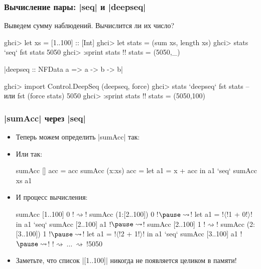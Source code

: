 \documentclass[11pt]{beamer}
\begin{document}
\begin{frame}[fragile]
  \frametitle{Вычисление пары: \haskinline|seq| и \haskinline|deepseq|}
  \small
  Выведем сумму наблюдений. Вычислится ли их число?
  \begin{haskellsmall}
    ghci> let xs = [1..100] :: [Int]
    ghci> let stats = (sum xs, length xs)
    ghci> stats `seq` fst stats
    5050
    ghci> :sprint stats !\pause!
    stats = (5050,_)
  \end{haskellsmall}
  \haskinline|deepseq :: NFData a => a -> b -> b|
  \begin{haskellsmall}
    ghci> import Control.DeepSeq (deepseq, force)
    ghci> stats `deepseq` fst stats  -- или fst (force stats)
    5050
    ghci> :sprint stats !\pause!
    stats = (5050,100)
  \end{haskellsmall}
\end{frame}

\begin{frame}[fragile]
  \frametitle{\haskinline|sumAcc| через \haskinline|seq|}
  \begin{itemize}
    \item Теперь можем определить \haskinline|sumAcc| так:\pause
    \item Или так:\pause
          \begin{haskell}
            sumAcc [] acc = acc
            sumAcc (x:xs) acc = let a1 = x + acc in
                             a1 `seq` sumAcc xs a1
          \end{haskell}
    \item И процесс вычисления:
          \begin{haskellsmall}
            sumAcc [1..100] 0 !$\rightsquigarrow$! sumAcc (1:[2..100]) 0 !$\pause \rightsquigarrow$!
            let a1 = !$\langle$!1 + 0!$\rangle$! in a1 `seq` sumAcc [2..100] a1 !$\pause \rightsquigarrow$!
            sumAcc [2..100] 1 !$\rightsquigarrow$! sumAcc (2:[3..100]) 1 !$\pause \rightsquigarrow$!
            let a1 = !$\langle$!2 + 1!$\rangle$! in a1 `seq` sumAcc [3..100] a1 !$\pause \rightsquigarrow$!
            !$\rightsquigarrow\ \ldots\ \rightsquigarrow\ $!5050
          \end{haskellsmall}
    \item Заметьте, что список \haskinline|[1..100]| никогда не появляется целиком в памяти!
  \end{itemize}
\end{frame}
\end{document}
